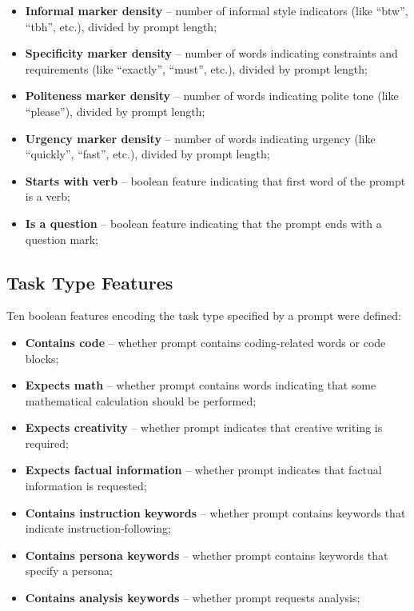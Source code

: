 \documentclass[a4paper,11pt,twoside]{report}
\theoremstyle{definition}
\begin{document}
\begin{itemize}
    \item \textbf{Informal marker density} -- number of informal style indicators (like ``btw'', ``tbh'', etc.), divided by prompt length;
    \item \textbf{Specificity marker density} -- number of words indicating constraints and requirements (like ``exactly'', ``must'', etc.), divided by prompt length;
    \item \textbf{Politeness marker density} -- number of words indicating polite tone (like ``please''), divided by prompt length;
    \item \textbf{Urgency marker density} -- number of words indicating urgency (like ``quickly'', ``fast'', etc.), divided by prompt length;
    \item \textbf{Starts with verb} -- boolean feature indicating that first word of the prompt is a verb;
    \item \textbf{Is a question} -- boolean feature indicating that the prompt ends with a question mark;
\end{itemize}

\subsection{Task Type Features}

Ten boolean features encoding the task type specified by a prompt were defined:

\begin{itemize}
    \item \textbf{Contains code} -- whether prompt contains coding-related words or code blocks;
    \item \textbf{Expects math} -- whether prompt contains words indicating that some mathematical calculation should be performed;
    \item \textbf{Expects creativity} -- whether prompt indicates that creative writing is required;
    \item \textbf{Expects factual information} -- whether prompt indicates that factual information is requested;
    \item \textbf{Contains instruction keywords} -- whether prompt contains keywords that indicate instruction-following;
    \item \textbf{Contains persona keywords} -- whether prompt contains keywords that specify a persona;
    \item \textbf{Contains analysis keywords} -- whether prompt requests analysis;
\end{itemize}
\end{document}
